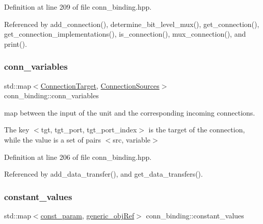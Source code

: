 Definition at line 209 of file conn\+\_\+binding.\+hpp.



Referenced by add\+\_\+connection(), determine\+\_\+bit\+\_\+level\+\_\+mux(), get\+\_\+connection(), get\+\_\+connection\+\_\+implementations(), is\+\_\+connection(), mux\+\_\+connection(), and print().

\mbox{\label{classconn__binding_a898c3972aa4e06c44a5154132e476471}} 
\subsubsection{\texorpdfstring{conn\+\_\+variables}{conn\_variables}}
{\footnotesize\ttfamily std\+::map$<$\hyperlink{structconn__binding_1_1ConnectionTarget}{Connection\+Target}, \hyperlink{classconn__binding_aa5406c3bf4cee893234c2b0847471f56}{Connection\+Sources}$>$ conn\+\_\+binding\+::conn\+\_\+variables\hspace{0.3cm}{\ttfamily [protected]}}



map between the input of the unit and the corresponding incoming connections. 

The key $<$tgt, tgt\+\_\+port, tgt\+\_\+port\+\_\+index$>$ is the target of the connection, while the value is a set of pairs $<$src, variable$>$ 

Definition at line 206 of file conn\+\_\+binding.\+hpp.



Referenced by add\+\_\+data\+\_\+transfer(), and get\+\_\+data\+\_\+transfers().

\mbox{\label{classconn__binding_a4f1b9a9fec4cdc7cbac192dd943aed23}} 
\subsubsection{\texorpdfstring{constant\+\_\+values}{constant\_values}}
{\footnotesize\ttfamily std\+::map$<$\hyperlink{classconn__binding_a08cb5241cd588e215f61ab30d27a14c0}{const\+\_\+param}, \hyperlink{generic__obj_8hpp_acb533b2ef8e0fe72e09a04d20904ca81}{generic\+\_\+obj\+Ref}$>$ conn\+\_\+binding\+::constant\+\_\+values\hspace{0.3cm}{\ttfamily [protected]}}



